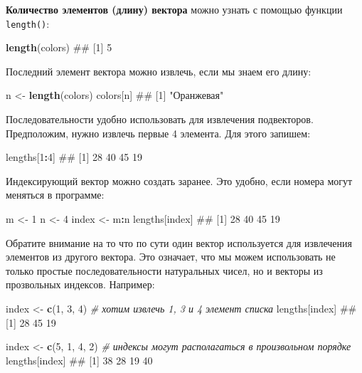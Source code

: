 \documentclass[]{book}
\newenvironment{Shaded}{\begin{snugshade}}{\end{snugshade}}
\newcommand{\KeywordTok}[1]{\textcolor[rgb]{0.13,0.29,0.53}{\textbf{#1}}}
\newcommand{\DecValTok}[1]{\textcolor[rgb]{0.00,0.00,0.81}{#1}}
\newcommand{\StringTok}[1]{\textcolor[rgb]{0.31,0.60,0.02}{#1}}
\newcommand{\CommentTok}[1]{\textcolor[rgb]{0.56,0.35,0.01}{\textit{#1}}}
\newcommand{\OperatorTok}[1]{\textcolor[rgb]{0.81,0.36,0.00}{\textbf{#1}}}
\newcommand{\NormalTok}[1]{#1}
\begin{document}
\textbf{Количество элементов (длину) вектора} можно узнать с помощью
функции \texttt{length()}:

\begin{Shaded}
\begin{Highlighting}[]
\KeywordTok{length}\NormalTok{(colors)}
\NormalTok{## [1] 5}
\end{Highlighting}
\end{Shaded}

Последний элемент вектора можно извлечь, если мы знаем его длину:

\begin{Shaded}
\begin{Highlighting}[]
\NormalTok{n <-}\StringTok{ }\KeywordTok{length}\NormalTok{(colors)}
\NormalTok{colors[n]}
\NormalTok{## [1] "Оранжевая"}
\end{Highlighting}
\end{Shaded}

Последовательности удобно использовать для извлечения подвекторов.
Предположим, нужно извлечь первые 4 элемента. Для этого запишем:

\begin{Shaded}
\begin{Highlighting}[]
\NormalTok{lengths[}\DecValTok{1}\OperatorTok{:}\DecValTok{4}\NormalTok{]}
\NormalTok{## [1] 28 40 45 19}
\end{Highlighting}
\end{Shaded}

Индексирующий вектор можно создать заранее. Это удобно, если номера
могут меняться в программе:

\begin{Shaded}
\begin{Highlighting}[]
\NormalTok{m <-}\StringTok{ }\DecValTok{1}
\NormalTok{n <-}\StringTok{ }\DecValTok{4}
\NormalTok{index <-}\StringTok{ }\NormalTok{m}\OperatorTok{:}\NormalTok{n}
\NormalTok{lengths[index]}
\NormalTok{## [1] 28 40 45 19}
\end{Highlighting}
\end{Shaded}

Обратите внимание на то что по сути один вектор используется для
извлечения элементов из другого вектора. Это означает, что мы можем
использовать не только простые последовательности натуральных чисел, но
и векторы из прозвольных индексов. Например:

\begin{Shaded}
\begin{Highlighting}[]
\NormalTok{index <-}\StringTok{ }\KeywordTok{c}\NormalTok{(}\DecValTok{1}\NormalTok{, }\DecValTok{3}\NormalTok{, }\DecValTok{4}\NormalTok{) }\CommentTok{# хотим извлечь 1, 3 и 4 элемент списка}
\NormalTok{lengths[index]}
\NormalTok{## [1] 28 45 19}

\NormalTok{index <-}\StringTok{ }\KeywordTok{c}\NormalTok{(}\DecValTok{5}\NormalTok{, }\DecValTok{1}\NormalTok{, }\DecValTok{4}\NormalTok{, }\DecValTok{2}\NormalTok{) }\CommentTok{# индексы могут располагаться в произвольном порядке}
\NormalTok{lengths[index]}
\NormalTok{## [1] 38 28 19 40}
\end{Highlighting}
\end{Shaded}
\end{document}
